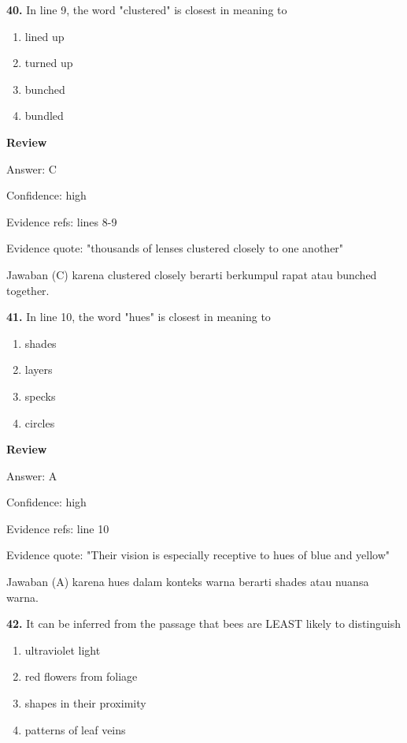 \documentclass[12pt]{article}
\begin{document}
\endgroup
\par
\vspace{0.25\baselineskip}
\noindent\textbf{40.} In line 9, the word "clustered" is closest in meaning to
\begin{enumerate}[label=(\Alph*),leftmargin=*,itemsep=0.2em]
\item lined up
\item turned up
\item bunched
\item bundled
\end{enumerate}
\par
\begingroup
\setlength{\parskip}{0pt}
\setlength{\parindent}{0pt}
\textbf{Review}\par
Answer: C\par
Confidence: high\par
Evidence refs: lines 8-9\par
Evidence quote: "thousands of lenses clustered closely to one another"\par
Jawaban (C) karena clustered closely berarti berkumpul rapat atau bunched together.\par
\endgroup
\par
\vspace{0.25\baselineskip}
\noindent\textbf{41.} In line 10, the word "hues" is closest in meaning to
\begin{enumerate}[label=(\Alph*),leftmargin=*,itemsep=0.2em]
\item shades
\item layers
\item specks
\item circles
\end{enumerate}
\par
\begingroup
\setlength{\parskip}{0pt}
\setlength{\parindent}{0pt}
\textbf{Review}\par
Answer: A\par
Confidence: high\par
Evidence refs: line 10\par
Evidence quote: "Their vision is especially receptive to hues of blue and yellow"\par
Jawaban (A) karena hues dalam konteks warna berarti shades atau nuansa warna.\par
\endgroup
\par
\vspace{0.25\baselineskip}
\noindent\textbf{42.} It can be inferred from the passage that bees are LEAST likely to distinguish
\begin{enumerate}[label=(\Alph*),leftmargin=*,itemsep=0.2em]
\item ultraviolet light
\item red flowers from foliage
\item shapes in their proximity
\item patterns of leaf veins
\end{enumerate}
\end{document}

